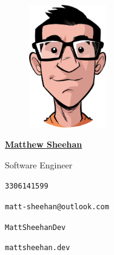 \documentclass[12pt, oneside, final]{article}
\newlength{\logowidth}  \setlength{\logowidth}{0.75in}
\begin{document}
  \thispagestyle{empty}
  


    \begin{figure}
        \includegraphics[width = 0.3\textwidth]{figures/matthew_sheehan.png}
    \end{figure}


  \underline{\large\textsf{\textbf{Matthew Sheehan}}}

  \textmd{\small{Software Engineer}}

  \vfill

  \vspace*{\fill}
  {\footnotesize{\faPhone}} \small{\texttt{330{\textendash}614{\textendash}1599}}

  \vspace*{\fill}
  {\footnotesize{\faEnvelope}} \small{\texttt{matt-sheehan@outlook.com}}

  \vspace*{\fill}
  {\footnotesize{\faGithub}} \small{\texttt{MattSheehanDev}}

  \vspace*{\fill}
  {\footnotesize{\faGlobe}} \small{\texttt{mattsheehan.dev}}
\end{document}

